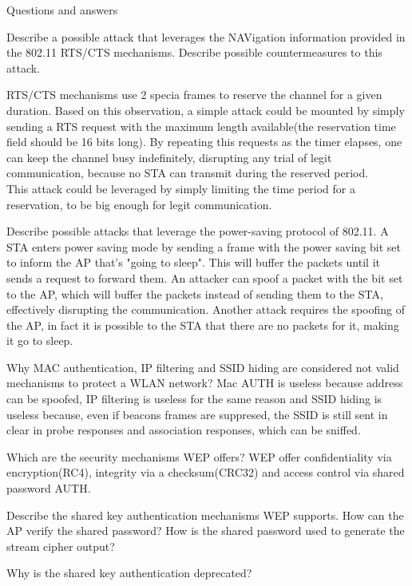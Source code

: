 \begin{section}{Questions and answers}
\begin{subsubsection}{Describe a possible attack that leverages the NAVigation information
    provided in the 802.11 RTS/CTS mechanisms. Describe possible countermeasures to this attack.}
  \end{subsubsection}
    RTS/CTS mechanisms use 2 specia frames to reserve the channel for a given duration. Based on
    this observation, a simple attack could be mounted by simply sending a RTS request with the
    maximum length available(the reservation time field should be 16 bits long). By repeating this
    requests as the timer elapses, one can keep the channel busy indefinitely, disrupting any trial
    of legit communication, because no STA can transmit during the reserved period.\\
    This attack could be leveraged by simply limiting the time period for a reservation, to be big
    enough for legit communication.
  \begin{subsubsection}{Describe possible attacks that leverage the power-saving protocol of
    802.11.}
    A STA enters power saving mode by sending a frame with the power saving bit set to inform the AP
    that's "going to sleep". This will buffer the packets until it sends a request to forward them.
    An attacker can spoof a packet with the bit set to the AP, which will buffer the packets instead
    of sending them to the STA, effectively disrupting the communication. Another attack requires
    the spoofing of the AP, in fact it is possible to the STA that there are no packets for it,
    making it go to sleep.
  \end{subsubsection}
  \begin{subsubsection}{Why MAC authentication, IP filtering and SSID hiding are considered not
    valid mechanisms to protect a WLAN network?}
    Mac AUTH is useless because address can be spoofed, IP filtering is useless for the same reason
    and SSID hiding is useless because, even if beacons frames are suppresed, the SSID is still sent
    in clear in probe responses and association responses, which can be sniffed.
  \end{subsubsection}
  \begin{subsubsection}{Which are the security mechanisms WEP offers?}
    WEP offer confidentiality via encryption(RC4), integrity via a checksum(CRC32) and access
    control via shared password AUTH.
  \end{subsubsection}
  \begin{subsubsection}{Describe the shared key authentication mechanisms WEP supports. How can the
      AP verify the shared password? How is the shared password used to generate the stream cipher
    output?}
  \end{subsubsection}
  \begin{subsubsection}{Why is the shared key authentication deprecated?}
  \end{subsubsection}
\end{section}
